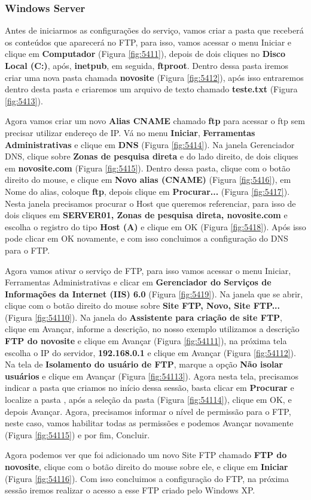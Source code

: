 \documentclass[10pt]{article}
\begin{document}
\subsubsection{Windows Server}
Antes de iniciarmos as configurações do serviço, vamos criar a pasta que receberá os conteúdos que aparecerá no FTP, para isso, vamos acessar o menu Iniciar e clique em \textbf{Computador} (Figura \ref{fig:5411}), depois de dois cliques no \textbf{Disco Local (C:)}, após, \textbf{inetpub}, em seguida, \textbf{ftproot}. Dentro dessa pasta iremos criar uma nova pasta chamada \textbf{novosite} (Figura \ref{fig:5412}), após isso entraremos dentro desta pasta e criaremos um arquivo de texto chamado \textbf{teste.txt} (Figura \ref{fig:5413}).
\par Agora vamos criar um novo \textbf{Alias CNAME} chamado \textbf{ftp} para acessar o ftp sem precisar utilizar endereço de IP. Vá no menu \textbf{Iniciar}, \textbf{Ferramentas Administrativas} e clique em \textbf{DNS} (Figura \ref{fig:5414}). Na janela Gerenciador DNS, clique sobre \textbf{Zonas de pesquisa direta} e do lado direito, de dois cliques em \textbf{novosite.com} (Figura \ref{fig:5415}). Dentro dessa pasta, clique com o botão direito do mouse, e clique em \textbf{Novo alias (CNAME)} (Figura \ref{fig:5416}), em Nome do alias, coloque \textbf{ftp}, depois clique em \textbf{Procurar...} (Figura \ref{fig:5417}). Nesta janela precisamos procurar o Host que queremos referenciar, para isso de dois cliques em \textbf{SERVER01, Zonas de pesquisa direta, novosite.com} e escolha o registro do tipo \textbf{Host (A)} e clique em OK (Figura \ref{fig:5418}). Após isso pode clicar em OK novamente, e com isso concluimos a configuração do DNS para o FTP.
\par Agora vamos ativar o serviço de FTP, para isso vamos acessar o menu Iniciar, Ferramentas Administrativas e clicar em \textbf{Gerenciador do Serviços de Informações da Internet (IIS) 6.0} (Figura \ref{fig:5419}). Na janela que se abrir, clique com o botão direito do mouse sobre \textbf{Site FTP, Novo, Site FTP...} (Figura \ref{fig:54110}). Na janela do \textbf{Assistente para criação de site FTP}, clique em Avançar, informe a descrição, no nosso exemplo utilizamos a descrição \textbf{FTP do novosite} e clique em Avançar (Figura \ref{fig:54111}), na próxima tela escolha o IP do servidor, \textbf{192.168.0.1} e clique em Avançar (Figura \ref{fig:54112}). Na tela de \textbf{Isolamento do usuário de FTP}, marque a opção \textbf{Não isolar usuários} e clique em Avançar (Figura \ref{fig:54113}). Agora nesta tela, precisamos indicar a pasta que criamos no início dessa sessão, basta clicar em \textbf{Procurar} e localize a pasta , após a seleção da pasta (Figura \ref{fig:54114}), clique em OK, e depois Avançar. Agora, precisamos informar o nível de permissão para o FTP, neste caso, vamos habilitar todas as permissões e podemos Avançar novamente (Figura \ref{fig:54115}) e por fim, Concluir.
\par Agora podemos ver que foi adicionado um novo Site FTP chamado \textbf{FTP do novosite}, clique com o botão direito do mouse sobre ele, e clique em \textbf{Iniciar} (Figura \ref{fig:54116}). Com isso concluimos a configuração do FTP, na próxima sessão iremos realizar o acesso a esse FTP criado pelo Windows XP.
\end{document}
